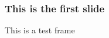 \documentclass[10pt]{beamer}
\begin{document}
\begin{frame}
\frametitle{This is the first slide}
This is a test frame
\end{frame}
\end{document}
